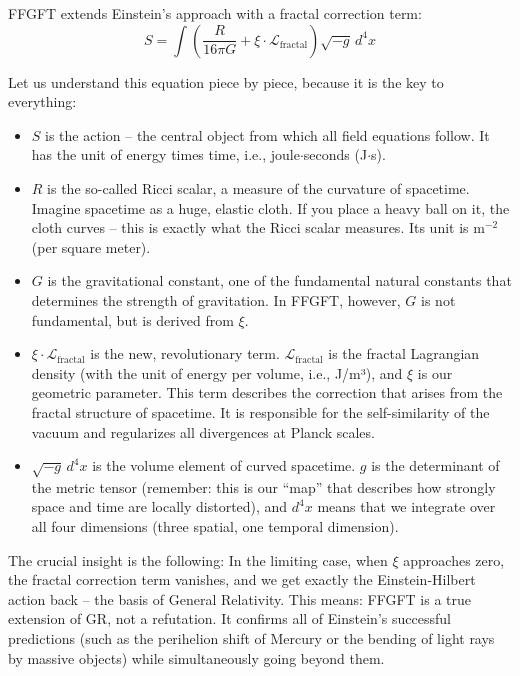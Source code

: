 FFGFT extends Einstein's approach with a fractal correction term:
\begin{equation}
S = \int \left( \frac{R}{16\pi G} + \xi \cdot \mathcal{L}_{\text{fractal}} \right) \sqrt{-g} \, d^4x
\end{equation}

Let us understand this equation piece by piece, because it is the key to everything:

\begin{itemize}[leftmargin=*]
\item \textbf{$S$} is the action -- the central object from which all field equations follow. It has the unit of energy times time, i.e., joule$\cdot$seconds (J$\cdot$s).

\item \textbf{$R$} is the so-called Ricci scalar, a measure of the curvature of spacetime. Imagine spacetime as a huge, elastic cloth. If you place a heavy ball on it, the cloth curves -- this is exactly what the Ricci scalar measures. Its unit is $\text{m}^{-2}$ (per square meter).

\item \textbf{$G$} is the gravitational constant, one of the fundamental natural constants that determines the strength of gravitation. In FFGFT, however, $G$ is not fundamental, but is derived from $\xi$.

\item \textbf{$\xi \cdot \mathcal{L}_{\text{fractal}}$} is the new, revolutionary term. $\mathcal{L}_{\text{fractal}}$ is the fractal Lagrangian density (with the unit of energy per volume, i.e., J/m³), and $\xi$ is our geometric parameter. This term describes the correction that arises from the fractal structure of spacetime. It is responsible for the self-similarity of the vacuum and regularizes all divergences at Planck scales.

\item \textbf{$\sqrt{-g} \, d^4x$} is the volume element of curved spacetime. $g$ is the determinant of the metric tensor (remember: this is our ``map'' that describes how strongly space and time are locally distorted), and $d^4x$ means that we integrate over all four dimensions (three spatial, one temporal dimension).
\end{itemize}

The crucial insight is the following: In the limiting case, when $\xi$ approaches zero, the fractal correction term vanishes, and we get exactly the Einstein-Hilbert action back -- the basis of General Relativity. This means: FFGFT is a true extension of GR, not a refutation. It confirms all of Einstein's successful predictions (such as the perihelion shift of Mercury or the bending of light rays by massive objects) while simultaneously going beyond them.

